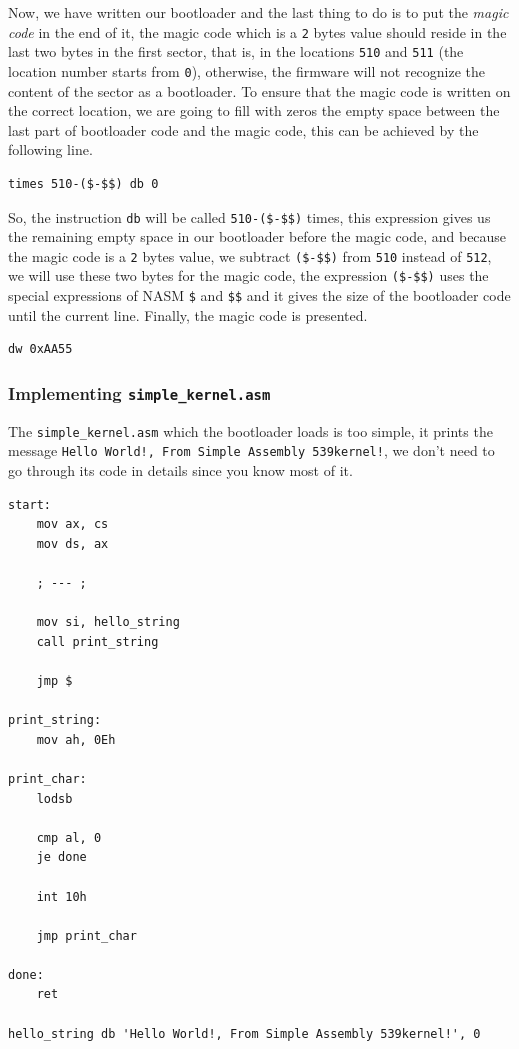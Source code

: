 Now, we have written our bootloader and the last thing to do is to put
the \emph{magic code} in the end of it, the magic code which is a
\lstinline!2! bytes value should reside in the last two bytes in the
first sector, that is, in the locations \lstinline!510! and
\lstinline!511! (the location number starts from \lstinline!0!),
otherwise, the firmware will not recognize the content of the sector as
a bootloader. To ensure that the magic code is written on the correct
location, we are going to fill with zeros the empty space between the
last part of bootloader code and the magic code, this can be achieved by
the following line.

\begin{lstlisting}
times 510-($-$$) db 0
\end{lstlisting}

So, the instruction \lstinline!db! will be called \lstinline!510-($-$$)!
times, this expression gives us the remaining empty space in our
bootloader before the magic code, and because the magic code is a
\lstinline!2! bytes value, we subtract \lstinline!($-$$)! from
\lstinline!510! instead of \lstinline!512!, we will use these two bytes
for the magic code, the expression \lstinline!($-$$)! uses the special
expressions of NASM \lstinline!$! and \lstinline!$$! and it gives the
size of the bootloader code until the current line. Finally, the magic
code is presented.

\begin{lstlisting}
dw 0xAA55
\end{lstlisting}

\subsubsection{\texorpdfstring{Implementing
\texttt{simple\_kernel.asm}}{Implementing simple\_kernel.asm}}\label{implementing-simple_kernel.asm}

The \lstinline!simple_kernel.asm! which the bootloader loads is too
simple, it prints the message
\lstinline"Hello World!, From Simple Assembly 539kernel!", we don't need
to go through its code in details since you know most of it.

\begin{lstlisting}
start:
    mov ax, cs
    mov ds, ax

    ; --- ;
    
    mov si, hello_string
    call print_string
    
    jmp $

print_string:
    mov ah, 0Eh

print_char:
    lodsb
    
    cmp al, 0
    je done
    
    int 10h
    
    jmp print_char

done:
    ret
    
hello_string db 'Hello World!, From Simple Assembly 539kernel!', 0
\end{lstlisting}

